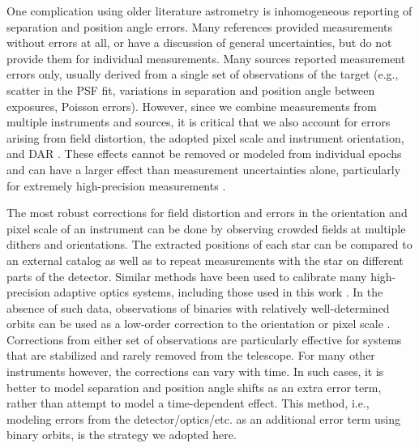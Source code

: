 \documentclass[twocolumn]{aastex62}
\begin{document}
One complication using older literature astrometry is inhomogeneous reporting of separation and position angle errors. Many references provided measurements without errors at all, or have a discussion of general uncertainties, but do not provide them for individual measurements. Many sources reported measurement errors only, usually derived from a single set of observations of the target (e.g., scatter in the PSF fit, variations in separation and position angle between exposures, Poisson errors). However, since we combine measurements from multiple instruments and sources, it is critical that we also account for errors arising from field distortion, the adopted pixel scale and instrument orientation, and DAR \citep[e.g.,][]{2009AJ....137...83C}. These effects cannot be removed or modeled from individual epochs and can have a larger effect than measurement uncertainties alone, particularly for extremely high-precision measurements \citep[e.g.,][]{2009ApJ...690.1463L}.

The most robust corrections for field distortion and errors in the orientation and pixel scale of an instrument can be done by observing crowded fields at multiple dithers and orientations. The extracted positions of each star can be compared to an external catalog as well as to repeat measurements with the star on different parts of the detector. Similar methods have been used to calibrate many high-precision adaptive optics systems, including those used in this work \citep{Yelda2010, 2016PASP..128i5004S, 2015MNRAS.453.3234P}. In the absence of such data, observations of binaries with relatively well-determined orbits can be used as a low-order correction to the orientation or pixel scale \citep[e.g.,][]{Tok2015c}. Corrections from either set of observations are particularly effective for systems that are stabilized and rarely removed from the telescope. For many other instruments however, the corrections can vary with time. In such cases, it is better to model separation and position angle shifts as an extra error term, rather than attempt to model a time-dependent effect. This method, i.e., modeling errors from the detector/optics/etc. as an additional error term using binary orbits, is the strategy we adopted here.
\end{document}
